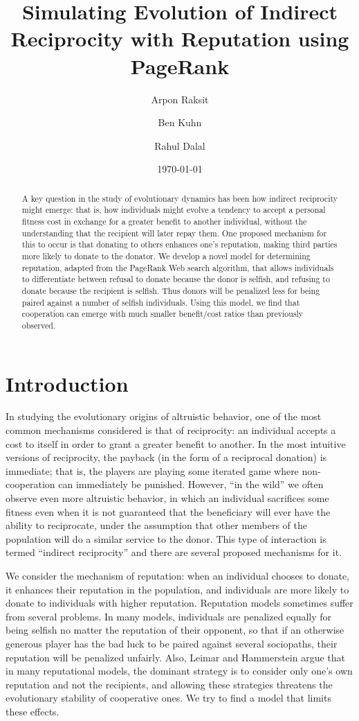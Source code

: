 \documentclass{amsart}
\title{Simulating Evolution of Indirect Reciprocity with Reputation using PageRank}
\author{Arpon Raksit \and Ben Kuhn \and Rahul Dalal}
\date{\today}
\begin{document}
\begin{abstract}
A key question in the study of evolutionary dynamics has been how
indirect reciprocity might emerge: that is, how individuals might
evolve a tendency to accept a personal fitness cost in exchange for a
greater benefit to another individual, without the understanding that
the recipient will later repay them. One proposed mechanism for this
to occur is that donating to others enhances one's reputation, making
third parties more likely to donate to the donator. We develop a novel
model for determining reputation, adapted from the PageRank Web search
algorithm, that allows individuals to differentiate between refusal to
donate because the donor is selfish, and refusing to donate because
the recipient is selfish. Thus donors will be penalized less for being
paired against a number of selfish individuals. Using this model, we
find that cooperation can emerge with much smaller benefit/cost ratios
than previously observed.
\end{abstract}

\maketitle

\section{Introduction}

In studying the evolutionary origins of altruistic behavior, one of
the most common mechanisms considered is that of reciprocity: an
individual accepts a cost to itself in order to grant a greater
benefit to another. In the most intuitive versions of reciprocity, the
payback (in the form of a reciprocal donation) is immediate; that is,
the players are playing some iterated game where non-cooperation can
immediately be punished. However, ``in the wild'' we often observe
even more altruistic behavior, in which an individual sacrifices some
fitness even when it is not guaranteed that the beneficiary will ever
have the ability to reciprocate, under the assumption that other
members of the population will do a similar service to the donor. This
type of interaction is termed ``indirect reciprocity'' and there are
several proposed mechanisms for it.

We consider the mechanism of reputation: when an individual chooses to
donate, it enhances their reputation in the population, and
individuals are more likely to donate to individuals with higher
reputation. Reputation models sometimes suffer from several
problems. In many models, individuals are penalized equally for being
selfish no matter the reputation of their opponent, so that if an
otherwise generous player has the bad luck to be paired against
several sociopaths, their reputation will be penalized unfairly. Also,
Leimar and Hammerstein \cite{leimar_evolution_2001} argue that in many
reputational models, the dominant strategy is to consider only one's
own reputation and not the recipients, and allowing these strategies
threatens the evolutionary stability of cooperative ones. We try to
find a model that limits these effects.
\end{document}

